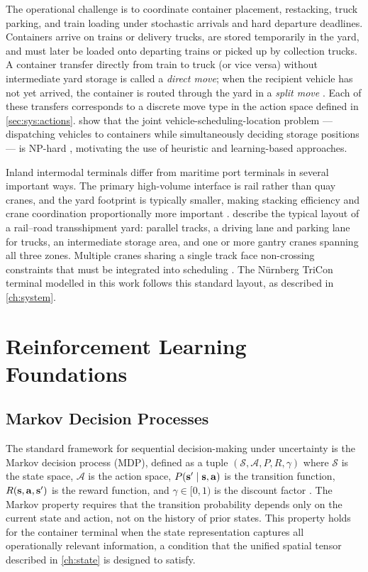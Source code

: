 The operational challenge is to coordinate container placement, restacking, truck parking, and train loading under stochastic arrivals and hard departure deadlines. Containers arrive on trains or delivery trucks, are stored temporarily in the yard, and must later be loaded onto departing trains or picked up by collection trucks. A container transfer directly from train to truck (or vice versa) without intermediate yard storage is called a \emph{direct move}; when the recipient vehicle has not yet arrived, the container is routed through the yard in a \emph{split move} \cite{boysen2013container}. Each of these transfers corresponds to a discrete move type in the action space defined in \cref{sec:sys:actions}. \textcite{vis2003transshipment} show that the joint vehicle-scheduling-location problem --- dispatching vehicles to containers while simultaneously deciding storage positions --- is NP-hard \cite{bish2001dispatching}, motivating the use of heuristic and learning-based approaches.

Inland intermodal terminals differ from maritime port terminals in several important ways. The primary high-volume interface is rail rather than quay cranes, and the yard footprint is typically smaller, making stacking efficiency and crane coordination proportionally more important \cite{caserta2009binary}. \textcite{boysen2013container} describe the typical layout of a rail--road transshipment yard: parallel tracks, a driving lane and parking lane for trucks, an intermediate storage area, and one or more gantry cranes spanning all three zones. Multiple cranes sharing a single track face non-crossing constraints that must be integrated into scheduling \cite{boysen2013container}. The N\"urnberg TriCon terminal modelled in this work follows this standard layout, as described in \cref{ch:system}.

\section{Reinforcement Learning Foundations}
\label{sec:bg:rl}

\subsection{Markov Decision Processes}
\label{sec:bg:rl:mdp}

The standard framework for sequential decision-making under uncertainty is the Markov decision process (MDP), defined as a tuple $(\mathcal{S}, \mathcal{A}, P, R, \gamma)$ where $\mathcal{S}$ is the state space, $\mathcal{A}$ is the action space, $P(\mathbf{s}' \mid \mathbf{s}, \mathbf{a})$ is the transition function, $R(\mathbf{s}, \mathbf{a}, \mathbf{s}')$ is the reward function, and $\gamma \in [0, 1)$ is the discount factor \cite{suttonbarto2018}. The Markov property requires that the transition probability depends only on the current state and action, not on the history of prior states. This property holds for the container terminal when the state representation captures all operationally relevant information, a condition that the unified spatial tensor described in \cref{ch:state} is designed to satisfy.


